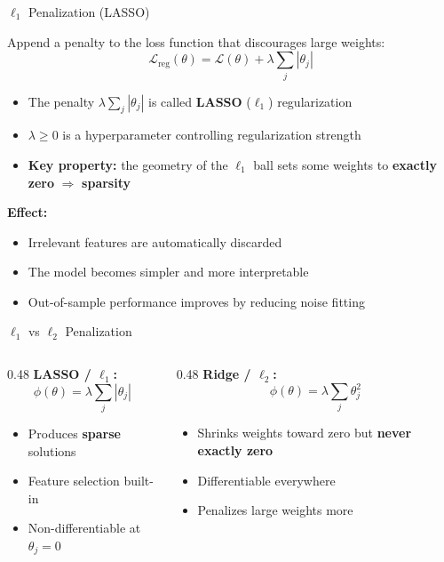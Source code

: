 \documentclass[aspectratio=169]{beamer}
\begin{document}
%
%
\begin{frame}{$\ell_1$ Penalization (LASSO)}

Append a penalty to the loss function that discourages large weights:
\[
\boxed{\mathcal{L}_{\text{reg}}(\theta) = \mathcal{L}(\theta) + \lambda \sum_j |\theta_j|}
\]

\begin{itemize}
    \item The penalty $\lambda \sum_j |\theta_j|$ is called \textbf{LASSO} ($\ell_1$) regularization
    \item $\lambda \geq 0$ is a hyperparameter controlling regularization strength
    \item \textbf{Key property:} the geometry of the $\ell_1$ ball sets some weights to \textbf{exactly zero} $\Rightarrow$ \textbf{sparsity}
\end{itemize}

\vspace{0.3cm}
\textbf{Effect:}
\begin{itemize}
    \item Irrelevant features are automatically discarded
    \item The model becomes simpler and more interpretable
    \item Out-of-sample performance improves by reducing noise fitting
\end{itemize}

\end{frame}
%
%
\begin{frame}{$\ell_1$ vs $\ell_2$ Penalization}
\begin{columns}
\begin{column}{0.48\textwidth}
\textbf{LASSO / $\ell_1$:}
\[
\phi(\theta) = \lambda \sum_j |\theta_j|
\]
\begin{itemize}
    \item Produces \textbf{sparse} solutions
    \item Feature selection built-in
    \item Non-differentiable at $\theta_j = 0$
\end{itemize}
\end{column}
\begin{column}{0.48\textwidth}
\textbf{Ridge / $\ell_2$:}
\[
\phi(\theta) = \lambda \sum_j \theta_j^2
\]
\begin{itemize}
    \item Shrinks weights toward zero but \textbf{never exactly zero}
    \item Differentiable everywhere
    \item Penalizes large weights more
\end{itemize}
\end{column}
\end{columns}
\end{frame}
\end{document}
